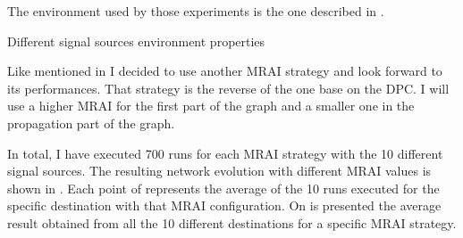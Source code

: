 The environment used by those experiments is the one described in
.

\begin{table}[h]
	
	\caption{Different signal sources environment properties}
	\label{tbl:source_properties}
\end{table}

Like mentioned in  I decided to use another
\ac{MRAI} strategy and look forward to its performances.
That strategy is the reverse of the one base on the \ac{DPC}.
I will use a higher \ac{MRAI} for the first part of the graph and a smaller
one in the propagation part of the graph.

In total, I have executed \num{700} runs for each \ac{MRAI} strategy with the
\num{10} different signal sources.
The resulting network evolution with different \ac{MRAI} values is shown in
.
Each point of  represents the average
of the \num{10} runs executed for the specific destination with that \ac{MRAI}
configuration.
On  is presented the average result
obtained from all the \num{10} different destinations for a specific \ac{MRAI}
strategy.

